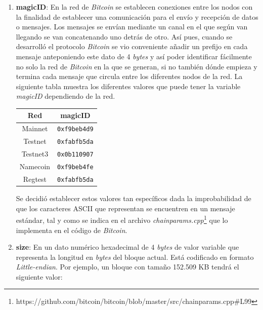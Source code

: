 \documentclass{article}
\begin{document}
    \begin{enumerate}
        \item \textbf{magicID}: En la red de \textit{Bitcoin} se establecen conexiones entre los nodos con la finalidad de establecer una comunicación para el envío y recepción de datos o mensajes. Los mensajes se envían mediante un canal en el que según van llegando se van concatenando uno detrás de otro. Así pues, cuando se desarrolló el protocolo \textit{Bitcoin} se vio conveniente añadir un prefijo en cada mensaje anteponiendo este dato de 4 \textit{bytes} y así poder identificar fácilmente no solo la red de \textit{Bitcoin} en la que se generan, si no también dónde empieza y termina cada mensaje que circula entre los diferentes nodos de la red. La siguiente tabla muestra los diferentes valores que puede tener la variable \textit{magicID} dependiendo de la red.
        
        \begin{table}[H]
        \centering
        \begin{tabular}{| c | c |} 
            \hline
            Red & magicID \\
            \hline
            Mainnet & \texttt{0xf9beb4d9} \\
            \hline
            Testnet & \texttt{0xfabfb5da} \\
            \hline
            Testnet3 & \texttt{0x0b110907} \\
            \hline
            Namecoin & \texttt{0xf9beb4fe} \\
            \hline
            Regtest & \texttt{0xfabfb5da} \\
            \hline
        \end{tabular}
        \label{table:1}
        \end{table}
        
        Se decidió establecer estos valores tan específicos dada la improbabilidad de que los caracteres ASCII que representan se encuentren en un mensaje estándar, tal y como se indica en el archivo \textit{chainparams.cpp}\footnote{https://github.com/bitcoin/bitcoin/blob/master/src/chainparams.cpp\#L99} que lo implementa en el código de \textit{Bitcoin}.
    
        \item \textbf{size}: En un dato numérico hexadecimal de 4 \textit{bytes} de valor variable que representa la longitud en \textit{bytes} del bloque actual. Está codificado en formato \textit{Little-endian}. Por ejemplo, un bloque con tamaño 152.509 KB tendrá el siguiente valor:
        

\end{enumerate}
\end{document}
